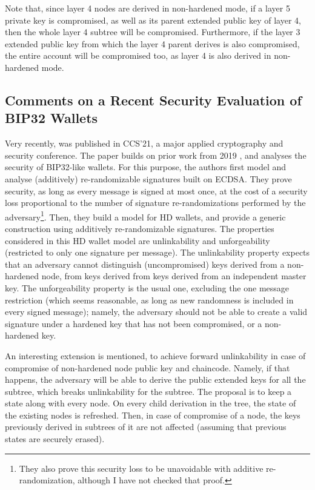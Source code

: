 Note that, since layer 4 nodes are derived in non-hardened mode, if a layer 5
private key is compromised, as well as its parent extended public key of layer
4, then the whole layer 4 subtree will be compromised. Furthermore, if the
layer 3 extended public key from which the layer 4 parent derives is also
compromised, the entire account will be compromised too, as layer 4 is also
derived in non-hardened mode.

\subsection{Comments on a Recent Security Evaluation of BIP32 Wallets}

Very recently, \cite{def+21} was published in CCS'21, a major applied
cryptography and security conference. The paper builds on prior work from
2019 \cite{dfl19}, and analyses the security of BIP32-like wallets. For this purpose,
the authors first model and analyse (additively) re-randomizable signatures
built on ECDSA. They prove security, as long as every message is signed at
most once, at the cost of a security loss proportional to the number of
signature re-randomizations performed by the adversary\footnote{They also prove
  this security loss to be unavoidable with additive re-randomization, although
  I have not checked that proof.}. Then, they build a model for HD wallets,
and provide a generic construction using additively re-randomizable signatures.
The properties considered in this HD wallet model are unlinkability and
unforgeability (restricted to only one signature per message). The unlinkability
property expects that an adversary cannot distinguish (uncompromised) keys
derived from a non-hardened node, from keys derived from keys derived from an
independent master key. The unforgeability property is the usual one, excluding
the one message restriction (which seems reasonable, as long as new randomness
is included in every signed message); namely, the adversary should not be able
to create a valid signature under a hardened key that has not been compromised,
or a non-hardened key.

An interesting extension is mentioned, to achieve forward unlinkability in case
of compromise of non-hardened node public key and chaincode. Namely, if that
happens, the adversary will be able to derive the public extended keys for
all the subtree, which breaks unlinkability for the subtree. The proposal is to
keep a state along with every node. On every child derivation in the tree, the
state of the existing nodes is refreshed. Then, in case of compromise of a
node, the keys previously derived in subtrees of it are not affected (assuming
that previous states are securely erased).

